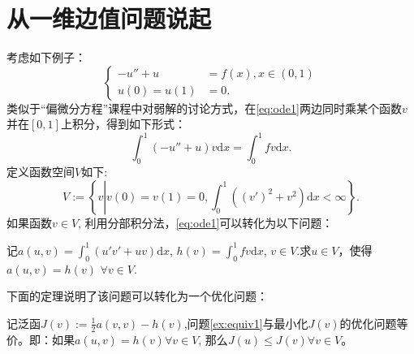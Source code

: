 \documentclass[lang=cn,10pt,newtx]{elegantbook}
\newcommand{\dif}{\mathrm{d}}
\begin{document}
\section{从一维边值问题说起}
考虑如下例子：
\begin{equation}
  \label{eq:ode1}
  \left\{
    \begin{aligned}
    -u''+u&=f(x),x\in(0,1)\\
    u(0)=u(1)&=0.
    \end{aligned}
  \right.
\end{equation}
类似于“偏微分方程”课程中对弱解的讨论方式，在\eqref{eq:ode1}两边同时乘某个函数$v$并在$[0,1]$上积分，得到如下形式：
\begin{equation}
  \label{eq:bianfen}
  \int_{0}^{1}(-u''+u)v\dif x=\int_{0}^{1}fv\dif x.
\end{equation}
定义函数空间$V$如下:
\begin{equation}
  \label{eq:sobolev1-1}
  V:=\left\{v\left.\right|v(0)=v(1)=0,\int_{0}^{1}((v')^{2}+v^{2})\dif x<\infty\right\}.
\end{equation}
如果函数$v\in V$, 利用分部积分法，\eqref{eq:ode1}可以转化为以下问题：
\begin{example}
  \label{ex:equiv1}
  记$a(u,v)=\int_{0}^{1}(u'v'+uv)\dif x$, $h(v)=\int_{0}^{1}fv\dif x$, $v\in V$.求$u\in V$，使得$a(u,v)=h(v)$ $\forall v\in V$.
\end{example}
下面的定理说明了该问题可以转化为一个优化问题：
\begin{theorem}{}{}
  \label{thm:bianfen}
  记泛函$J(v):=\frac{1}{2}a(v,v)-h(v)$,问题\ref{ex:equiv1}与最小化$J(v)$的优化问题等价。即：如果$a(u,v)=h(v)\forall v\in V$, 那么$J(u)\le J(v)\forall v\in V$。
\end{theorem}
\end{document}

